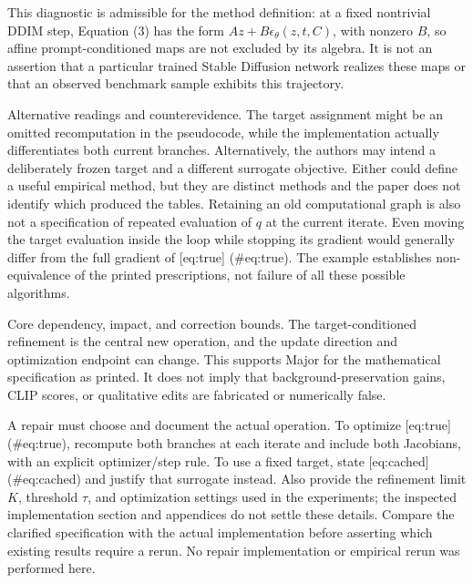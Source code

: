 \documentclass[10pt]{article}
\begin{document}
This diagnostic is admissible for the method definition: at a fixed nontrivial DDIM step, Equation (3) has the form \(A z+B\epsilon_\theta(z,t,C)\), with nonzero \(B\), so affine prompt-conditioned maps are not excluded by its algebra. It is not an assertion that a particular trained Stable Diffusion network realizes these maps or that an observed benchmark sample exhibits this trajectory.\par
Alternative readings and counterevidence. The target assignment might be an omitted recomputation in the pseudocode, while the implementation actually differentiates both current branches. Alternatively, the authors may intend a deliberately frozen target and a different surrogate objective. Either could define a useful empirical method, but they are distinct methods and the paper does not identify which produced the tables. Retaining an old computational graph is also not a specification of repeated evaluation of \(q\) at the current iterate. Even moving the target evaluation inside the loop while stopping its gradient would generally differ from the full gradient of [eq:true] (\#eq:true). The example establishes non-equivalence of the printed prescriptions, not failure of all these possible algorithms.\par
Core dependency, impact, and correction bounds. The target-conditioned refinement is the central new operation, and the update direction and optimization endpoint can change. This supports Major for the mathematical specification as printed. It does not imply that background-preservation gains, CLIP scores, or qualitative edits are fabricated or numerically false.\par
A repair must choose and document the actual operation. To optimize [eq:true] (\#eq:true), recompute both branches at each iterate and include both Jacobians, with an explicit optimizer/step rule. To use a fixed target, state [eq:cached] (\#eq:cached) and justify that surrogate instead. Also provide the refinement limit \(K\), threshold \(\tau\), and optimization settings used in the experiments; the inspected implementation section and appendices do not settle these details. Compare the clarified specification with the actual implementation before asserting which existing results require a rerun. No repair implementation or empirical rerun was performed here.\par
\end{document}
